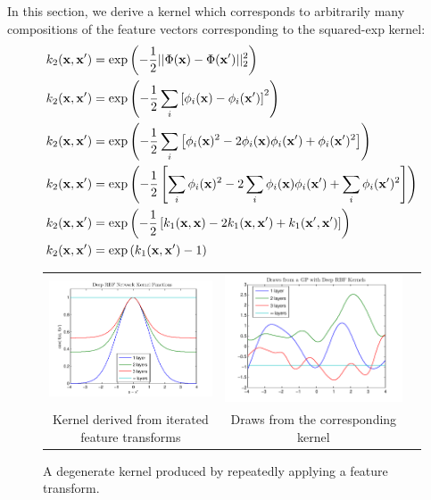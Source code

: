 \documentclass{article}
\begin{document}
In this section, we derive a kernel which corresponds to arbitrarily many compositions of the feature vectors corresponding to the squared-exp kernel:
%
\begin{align}
k_2({\bf{x}}, {\bf{x}}') & = \exp \left( -\frac{1}{2} || \Phi({\bf{x}}) - \Phi({\bf{x}}')||_2^2 \right) \\
k_2({\bf{x}}, {\bf{x}}') & = \exp \left( -\frac{1}{2} \sum_i \left[ \phi_i({\bf{x}}) - \phi_i({\bf{x}}') \right]^2 \right) \\
k_2({\bf{x}}, {\bf{x}}') & = \exp\left ( -\frac{1}{2} \sum_i \left[ \phi_i({\bf{x}})^2 - 2 \phi_i({\bf{x}}) \phi_i({\bf{x}}') + \phi_i({\bf{x}}')^2 \right] \right) \\
k_2({\bf{x}}, {\bf{x}}') & = \exp \left( -\frac{1}{2} \left[ \sum_i \phi_i({\bf{x}})^2 - 2 \sum_i \phi_i({\bf{x}}) \phi_i({\bf{x}}') + \sum_i \phi_i({\bf{x}}')^2 \right] \right) \\
k_2({\bf{x}}, {\bf{x}}') & = \exp \left( -\frac{1}{2} \left[ k_1({\bf{x}}, {\bf{x}}) - 2 k_1({\bf{x}}, {\bf{x}}') + k_1({\bf{x}}', {\bf{x}}') \right] \right) \\
k_2({\bf{x}}, {\bf{x}}') & = \exp \left( k_1({\bf{x}}, {\bf{x}}') - 1 \right)
\end{align}
%
\begin{figure}
\centering
\begin{tabular}{ccc}
\includegraphics[width=0.5\columnwidth, clip, trim = 0cm 0cm 0cm 0.61cm]{figures/deep_kernel} &
\includegraphics[width=0.5\columnwidth, clip, trim = 0cm 0cm 0cm 0.61cm]{figures/deep_kernel_draws} \\
Kernel derived from iterated feature transforms & Draws from the corresponding kernel
\end{tabular}
\caption{A degenerate kernel produced by repeatedly applying a feature transform.}
\label{fig:deep_kernel}
\end{figure}
\end{document}
